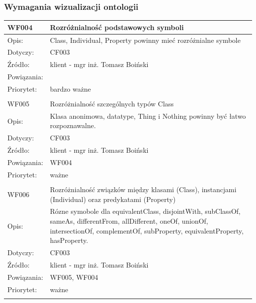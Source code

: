 \subsubsection{Wymagania wizualizacji ontologii}

\begin{center}
\begin{tabular}{|m{3cm}|m{9cm}|} \hline

WF004 & Rozróżnialność podstawowych symboli  \\ \hline
Opis: &  Class, Individual, Property powinny mieć rozróżnialne symbole   \\ \hline
Dotyczy: &  CF003 \\ \hline
Źródło: &  klient - mgr inż. Tomasz Boiński\\ \hline
Powiązania: & \\ \hline
Priorytet: & bardzo ważne \\ \hline

\multicolumn{2}{c}{} \\
 \hline

WF005 &   Rozróżnialność szczególnych typów Class\\ \hline
Opis: &   Klasa anonimowa, datatype, Thing i Nothing powinny być łatwo rozpoznawalne.  \\ \hline
Dotyczy: &  CF003 \\ \hline
Źródło: &  klient - mgr inż. Tomasz Boiński\\ \hline
Powiązania: & WF004 \\ \hline
Priorytet: &  ważne \\ \hline

\multicolumn{2}{c}{} \\
 \hline

WF006 &  Rozróżnialność związków między klasami (Class), instancjami (Individual) oraz predykatami (Property)\\ \hline
Opis: & Rózne symobole dla equivalentClass, disjointWith, subClassOf, sameAs, differentFrom, allDifferent, oneOf, unionOf, intersectionOf, complementOf, subProperty, equivalentProperty, hasProperty.   \\ \hline
Dotyczy: &  CF003\\ \hline
Źródło: &  klient - mgr inż. Tomasz Boiński \\ \hline
Powiązania: & WF005, WF004 \\ \hline
Priorytet: & ważne \\ \hline

\multicolumn{2}{c}{} \\
 \hline


\end{tabular}
\end{center}
